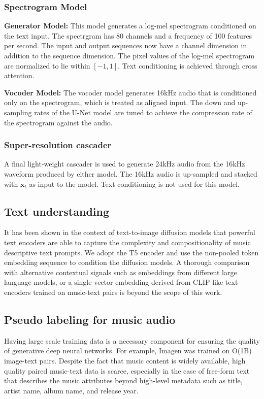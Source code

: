\documentclass[nohyperref]{article}
\theoremstyle{plain}
\theoremstyle{definition}
\theoremstyle{remark}
\begin{document}
\subsubsection{Spectrogram Model}

\textbf{Generator Model:} This model generates a log-mel spectrogram conditioned on the text input. The spectrgram has 80 channels and a frequency of 100 features per second. The input and output sequences now have a channel dimension in addition to the sequence dimension. The pixel values of the log-mel spectrogram are normalized to lie within $[-1, 1]$. Text conditioning is achieved through cross attention.

\textbf{Vocoder Model:} The vocoder model generates 16kHz audio that is conditioned only on the spectrogram, which is treated as aligned input. The down and up-sampling rates of the U-Net model are tuned to achieve the compression rate of the spectrogram against the audio.

\subsubsection{Super-resolution cascader}

A final light-weight cascader is used to generate 24kHz audio from the 16kHz waveform produced by either model. The 16kHz audio is up-sampled and stacked with $\mathbf{x}_t$ as input to the model. Text conditioning is not used for this model.

\subsection{Text understanding}

It has been shown in the context of text-to-image diffusion models \cite{saharia2022photorealistic,rombach2021highresolution} that powerful text encoders are able to capture the complexity and compositionality of music descriptive text prompts. We adopt the T5 encoder \cite{raffel2020exploring} and use the non-pooled token embedding sequence to condition the diffusion models. A thorough comparison with alternative contextual signals such as embeddings from different large language models, or a single vector embedding derived from CLIP-like \cite{radford2021learning} text encoders trained on music-text pairs \cite{mulan2022,ilaria-contrastive-audio} is beyond the scope of this work.

\subsection{Pseudo labeling for music audio}
Having large scale training data is a necessary component for ensuring the quality of generative deep neural networks. For example, Imagen \cite{saharia2022photorealistic} was trained on O(1B) image-text pairs.
Despite the fact that music content is widely available, high quality paired music-text data is scarce, especially in the case of free-form text that describes the music attributes beyond high-level metadata such as title, artist name, album name, and release year.
\end{document}
